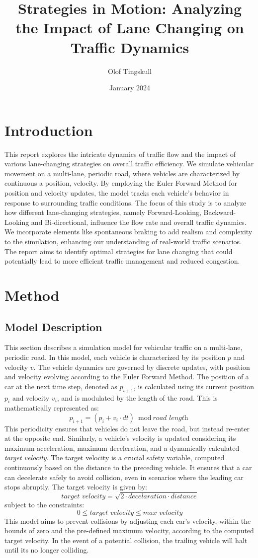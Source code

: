 \documentclass{article}
\title{Strategies in Motion: Analyzing the Impact of Lane Changing on Traffic Dynamics}
\author{Olof Tingskull}
\date{January 2024}
\begin{document}
\maketitle

\section{Introduction}
This report explores the intricate dynamics of traffic flow and the impact of various lane-changing strategies on overall traffic efficiency. We simulate vehicular movement on a multi-lane, periodic road, where vehicles are characterized by continuous a position,  velocity. By employing the Euler Forward Method for position and velocity updates, the model tracks each vehicle's behavior in response to surrounding traffic conditions. The focus of this study is to analyze how different lane-changing strategies, namely Forward-Looking, Backward-Looking and Bi-directional, influence the flow rate and overall traffic dynamics. We incorporate elements like spontaneous braking to add realism and complexity to the simulation, enhancing our understanding of real-world traffic scenarios. The report aims to identify optimal strategies for lane changing that could potentially lead to more efficient traffic management and reduced congestion.

\section{Method}

\subsection{Model Description}
This section describes a simulation model for vehicular traffic on a multi-lane, periodic road. In this model, each vehicle is characterized by its position $p$ and velocity $v$. The vehicle dynamics are governed by discrete updates, with position and velocity evolving according to the Euler Forward Method. The position of a car at the next time step, denoted as $p_{i+1}$, is calculated using its current position $p_i$ and velocity $v_i$, and is modulated by the length of the road. This is mathematically represented as:$$p_{i+1} = (p_i + v_i \cdot dt) \bmod \textit{road length}$$ This periodicity ensures that vehicles do not leave the road, but instead re-enter at the opposite end. Similarly, a vehicle's velocity is updated considering its maximum acceleration, maximum deceleration, and a dynamically calculated \textit{target velocity}. The target velocity is a crucial safety variable, computed continuously based on the distance to the preceding vehicle. It ensures that a car can decelerate safely to avoid collision, even in scenarios where the leading car stops abruptly. The target velocity is given by:
$$\textit{target velocity} = \sqrt{2 \cdot decelaration \cdot distance}  $$
subject to the constraints:
$$ 0 \leq \textit{target velocity} \leq \textit{max velocity}$$
This model aims to prevent collisions by adjusting each car's velocity, within the bounds of zero and the pre-defined maximum velocity, according to the computed target velocity. In the event of a potential collision, the trailing vehicle will halt until its no longer colliding.
\end{document}
